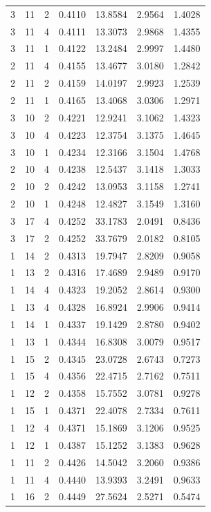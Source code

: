 \begin{tabular}{rrrrrrr}
3 & 11 & 2 & 0.4110 & 13.8584 & 2.9564 & 1.4028 \\
3 & 11 & 4 & 0.4111 & 13.3073 & 2.9868 & 1.4355 \\
3 & 11 & 1 & 0.4122 & 13.2484 & 2.9997 & 1.4480 \\
2 & 11 & 4 & 0.4155 & 13.4677 & 3.0180 & 1.2842 \\
2 & 11 & 2 & 0.4159 & 14.0197 & 2.9923 & 1.2539 \\
2 & 11 & 1 & 0.4165 & 13.4068 & 3.0306 & 1.2971 \\
3 & 10 & 2 & 0.4221 & 12.9241 & 3.1062 & 1.4323 \\
3 & 10 & 4 & 0.4223 & 12.3754 & 3.1375 & 1.4645 \\
3 & 10 & 1 & 0.4234 & 12.3166 & 3.1504 & 1.4768 \\
2 & 10 & 4 & 0.4238 & 12.5437 & 3.1418 & 1.3033 \\
2 & 10 & 2 & 0.4242 & 13.0953 & 3.1158 & 1.2741 \\
2 & 10 & 1 & 0.4248 & 12.4827 & 3.1549 & 1.3160 \\
3 & 17 & 4 & 0.4252 & 33.1783 & 2.0491 & 0.8436 \\
3 & 17 & 2 & 0.4252 & 33.7679 & 2.0182 & 0.8105 \\
1 & 14 & 2 & 0.4313 & 19.7947 & 2.8209 & 0.9058 \\
1 & 13 & 2 & 0.4316 & 17.4689 & 2.9489 & 0.9170 \\
1 & 14 & 4 & 0.4323 & 19.2052 & 2.8614 & 0.9300 \\
1 & 13 & 4 & 0.4328 & 16.8924 & 2.9906 & 0.9414 \\
1 & 14 & 1 & 0.4337 & 19.1429 & 2.8780 & 0.9402 \\
1 & 13 & 1 & 0.4344 & 16.8308 & 3.0079 & 0.9517 \\
1 & 15 & 2 & 0.4345 & 23.0728 & 2.6743 & 0.7273 \\
1 & 15 & 4 & 0.4356 & 22.4715 & 2.7162 & 0.7511 \\
1 & 12 & 2 & 0.4358 & 15.7552 & 3.0781 & 0.9278 \\
1 & 15 & 1 & 0.4371 & 22.4078 & 2.7334 & 0.7611 \\
1 & 12 & 4 & 0.4371 & 15.1869 & 3.1206 & 0.9525 \\
1 & 12 & 1 & 0.4387 & 15.1252 & 3.1383 & 0.9628 \\
1 & 11 & 2 & 0.4426 & 14.5042 & 3.2060 & 0.9386 \\
1 & 11 & 4 & 0.4440 & 13.9393 & 3.2491 & 0.9633 \\
1 & 16 & 2 & 0.4449 & 27.5624 & 2.5271 & 0.5474 \\

\end{tabular}
